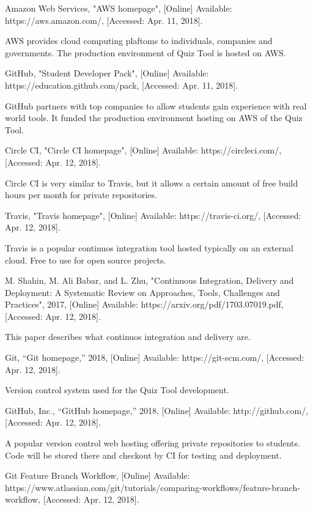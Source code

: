 \documentclass[11pt,a4paper]{report}
\begin{document}
\begin{thebibliography}{1}
 Amazon Web Services, "AWS homepage", [Online] Available: https://aws.amazon.com/, [Accessed: Apr. 11, 2018].

  AWS provides cloud computing plaftoms to individuals, companies and governments. The production environment of Quiz Tool is
  hosted on AWS.

 GitHub, "Student Developer Pack", [Online] Available: https://education.github.com/pack, [Accessed: Apr. 11, 2018].

  GitHub partners with top companies to allow students gain experience with real world tools. It funded the production
  environment hosting on AWS of the Quiz Tool.

 Circle CI, "Circle CI  homepage", [Online] Available: https://circleci.com/, [Accessed: Apr. 12, 2018].

  Circle CI is very similar to Travis, but it allows a certain amount of free build hours per month for private
  repositories.

 Travis, "Travis homepage", [Online] Available: https://travis-ci.org/, [Accessed: Apr. 12, 2018].

  Travis is a popular continuos integration tool hosted typically on an external cloud. Free to use for open source
  projects.

 M. Shahin, M. Ali Babar, and L. Zhu, "Continuous Integration, Delivery and Deployment: A Systematic Review on
    Approaches, Tools, Challenges and Practices", 2017, [Online] Available: https://arxiv.org/pdf/1703.07019.pdf, [Accessed: Apr. 12, 2018].

    This paper describes what continuos integration and delivery are.

 Git, “Git homepage,” 2018, [Online] Available: https://git-scm.com/, [Accessed: Apr. 12, 2018].

    Version control system used for the Quiz Tool development.

 GitHub, Inc., “GitHub homepage,” 2018, [Online] Available: http://github.com/, [Accessed: Apr. 12, 2018].

    A popular version control web hosting offering private repositories to students. Code will be stored there and checkout by CI for
    testing and deployment.

 Git Feature Branch Workflow, [Online] Available: https://www.atlassian.com/git/tutorials/comparing-workflows/feature-branch-workflow,
  [Accessed: Apr. 12, 2018].


\end{thebibliography}
\end{document}
